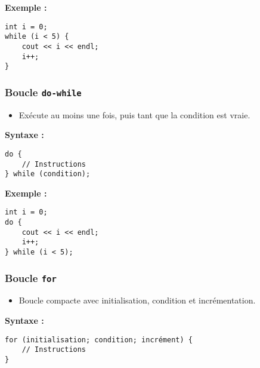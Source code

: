 \textbf{Exemple :}
\begin{tcolorbox}[colframe=blue!50!black, colback=blue!5!white, title=Exemple de la Boucle while]
\begin{verbatim}
int i = 0;
while (i < 5) {
    cout << i << endl;
    i++;
}
\end{verbatim}
\end{tcolorbox}

\subsubsection{ Boucle \texttt{do-while}}
\begin{itemize}
    \item Exécute au moins une fois, puis tant que la condition est vraie.
\end{itemize}

\textbf{Syntaxe :}
\begin{tcolorbox}[colframe=blue!50!black, colback=blue!5!white, title=Syntaxe de la Boucle do-while]
\begin{verbatim}
do {
    // Instructions
} while (condition);
\end{verbatim}
\end{tcolorbox}

\textbf{Exemple :}
\begin{tcolorbox}[colframe=blue!50!black, colback=blue!5!white, title=Exemple de la Boucle do-while]
\begin{verbatim}
int i = 0;
do {
    cout << i << endl;
    i++;
} while (i < 5);
\end{verbatim}
\end{tcolorbox}

\subsubsection{ Boucle \texttt{for}}
\begin{itemize}
    \item Boucle compacte avec initialisation, condition et incrémentation.
\end{itemize}

\textbf{Syntaxe :}
\begin{tcolorbox}[colframe=blue!50!black, colback=blue!5!white, title=Syntaxe de la Boucle for]
\begin{verbatim}
for (initialisation; condition; incrément) {
    // Instructions
}
\end{verbatim}
\end{tcolorbox}

